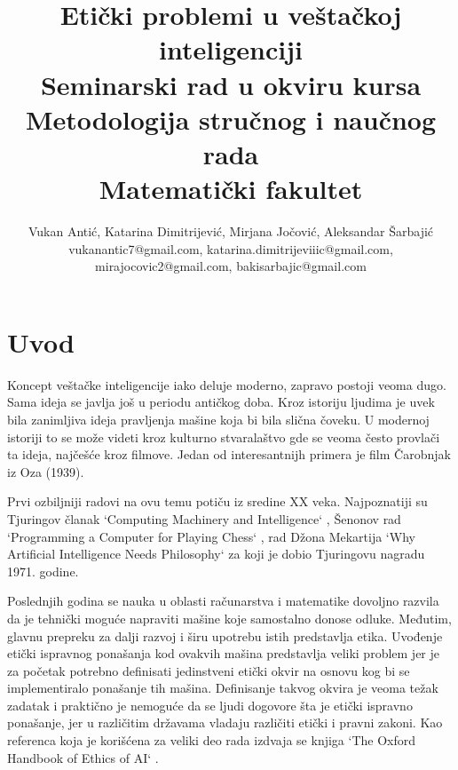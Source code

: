 \documentclass[a4paper]{article}
\begin{document}
\title{Etički problemi u veštačkoj inteligenciji\\ \small{Seminarski rad u okviru kursa\\Metodologija stručnog i naučnog rada\\ Matematički fakultet}}

\author{Vukan Antić, Katarina Dimitrijević, Mirjana Jočović, Aleksandar Šarbajić \\ vukanantic7@gmail.com, katarina.dimitrijeviiic@gmail.com, \\ mirajocovic2@gmail.com, bakisarbajic@gmail.com}


\maketitle


\tableofcontents

\newpage

\section{Uvod}
\label{sec:uvod}


Koncept veštačke inteligencije iako deluje moderno, zapravo postoji veoma dugo. \cite{introduction} Sama ideja se javlja još u periodu antičkog doba. Kroz istoriju ljudima je uvek bila zanimljiva ideja pravljenja mašine koja bi bila slična čoveku. U modernoj istoriji to se može videti kroz kulturno stvaralaštvo gde se veoma često provlači ta ideja, najčešće kroz filmove. Jedan od interesantnijh primera je film Čarobnjak iz Oza (1939).

Prvi ozbiljniji radovi na ovu temu potiču iz sredine XX veka. Najpoznatiji su Tjuringov članak `Computing Machinery and Intelligence` \cite{turing_compting}, Šenonov rad `Programming a Computer for Playing Chess` \cite{senon_sah}, rad Džona Mekartija `Why Artificial Intelligence Needs Philosophy` \cite{mekarti} za koji je dobio Tjuringovu nagradu 1971. godine. 

Poslednjih godina se nauka u oblasti računarstva i matematike dovoljno razvila da je tehnički moguće napraviti mašine koje samostalno donose odluke. Međutim, glavnu prepreku za dalji razvoj i širu upotrebu istih predstavlja etika. Uvođenje etički ispravnog ponašanja kod ovakvih mašina predstavlja veliki problem jer je za početak potrebno definisati jedinstveni etički okvir na osnovu kog bi se implementiralo ponašanje tih mašina. Definisanje takvog okvira je veoma težak zadatak i praktično je nemoguće da se ljudi dogovore šta je etički ispravno ponašanje, jer u različitim državama vladaju različiti etički i pravni zakoni. Kao referenca koja je korišćena za veliki deo rada izdvaja se knjiga `The Oxford Handbook of Ethics of AI` \cite{oxford_knjiga}.
\end{document}

